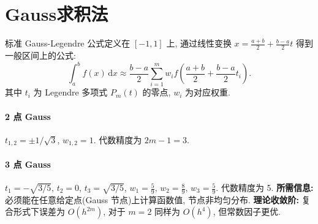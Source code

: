 \documentclass[12pt,a4paper]{ctexart}
\begin{document}
\section{Gauss求积法}
标准 Gauss-Legendre 公式定义在 $[-1,1]$ 上, 通过线性变换 $x = \frac{a+b}{2} + \frac{b-a}{2}t$ 得到一般区间上的公式: 
\[
\int_a^b f(x)\,\mathrm{d}x \approx \frac{b-a}{2}\sum_{i=1}^{m} w_i f\!\left( \frac{a+b}{2} + \frac{b-a}{2}t_i \right).
\]
其中 $t_i$ 为 Legendre 多项式 $P_m(t)$ 的零点, $w_i$ 为对应权重. 
\paragraph{2 点 Gauss}
$t_{1,2} = \pm 1/\sqrt{3}$, $w_{1,2}=1$. 代数精度为 $2m-1=3$. 
\paragraph{3 点 Gauss}
$t_1=-\sqrt{3/5},\, t_2=0,\, t_3=\sqrt{3/5}$, $w_1=\frac{5}{9},\, w_2=\frac{8}{9},\, w_3=\frac{5}{9}$. 代数精度为 5. 
\textbf{所需信息: }必须能在任意给定点(Gauss 节点)上计算函数值, 节点非均匀分布. 
\textbf{理论收敛阶: }复合形式下误差为 $O(h^{2m})$, 对于 $m=2$ 同样为 $O(h^4)$, 但常数因子更优. 
\end{document}
